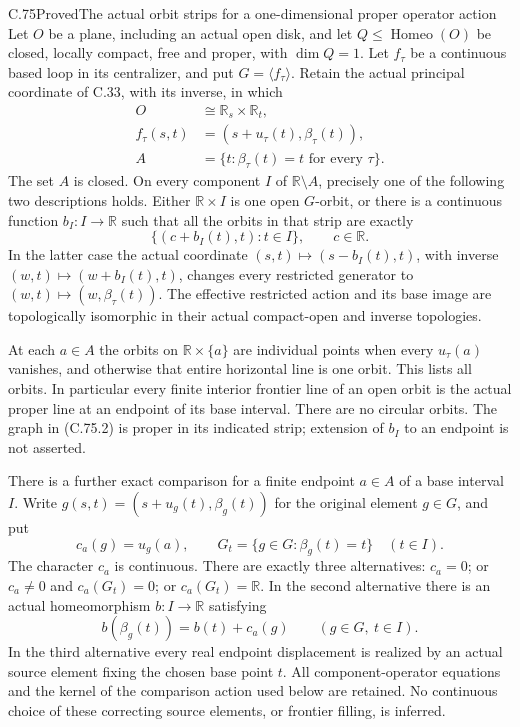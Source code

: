 \begin{claim}{C.75}{Proved}{The actual orbit strips for a one-dimensional proper operator action}
Let $O$ be a plane, including an actual open disk, and
let $Q\leq\operatorname{Homeo}(O)$ be closed, locally
compact, free and proper, with $\dim Q=1$.
Let $f_\tau$ be a continuous based loop in its
centralizer, and put $G=\langle f_\tau\rangle$.
Retain the actual principal coordinate of C.33,
with its inverse, in which
\[
 \begin{split}
 O&\cong\mathbb R_s\times\mathbb R_t,\\
 f_\tau(s,t)&=(s+u_\tau(t),\beta_\tau(t)),\\
 A&=\{t:\beta_\tau(t)=t\text{ for every }\tau\}.
 \end{split}                                                   \tag{C.75.1}
\]
The set $A$ is closed. On every component $I$ of
$\mathbb R\setminus A$, precisely one of the
following two descriptions holds.
Either $\mathbb R\times I$ is one open $G$-orbit,
or there is a continuous function $b_I:I\to\mathbb R$
such that all the orbits in that strip are exactly
\[
                   \{(c+b_I(t),t):t\in I\},
                                  \qquad c\in\mathbb R.        \tag{C.75.2}
\]
In the latter case the actual coordinate
$(s,t)\mapsto(s-b_I(t),t)$, with inverse
$(w,t)\mapsto(w+b_I(t),t)$, changes every restricted
generator to $(w,t)\mapsto(w,\beta_\tau(t))$.
The effective restricted action and its base image
are topologically isomorphic in their actual
compact-open and inverse topologies.

At each $a\in A$ the orbits on $\mathbb R\times\{a\}$
are individual points when every $u_\tau(a)$ vanishes,
and otherwise that entire horizontal line is one
orbit. This lists all orbits. In particular every
finite interior frontier line of an open orbit is
the actual proper line at an endpoint of its
base interval. There are no circular orbits.
The graph in (C.75.2) is proper in its indicated
strip; extension of $b_I$ to an endpoint is
not asserted.

There is a further exact comparison for a finite
endpoint $a\in A$ of a base interval $I$.
Write $g(s,t)=(s+u_g(t),\beta_g(t))$ for the
original element $g\in G$, and put
\[
 c_a(g)=u_g(a),\qquad
 G_t=\{g\in G:\beta_g(t)=t\}\quad(t\in I).
                                                               \tag{C.75.3}
\]
The character $c_a$ is continuous. There are
exactly three alternatives: $c_a=0$; or
$c_a\ne0$ and $c_a(G_t)=0$; or
$c_a(G_t)=\mathbb R$. In the second alternative
there is an actual homeomorphism
$b:I\to\mathbb R$ satisfying
\[
                 b(\beta_g(t))=b(t)+c_a(g)
                                  \qquad(g\in G,\ t\in I).
                                                               \tag{C.75.4}
\]
In the third alternative every real endpoint
displacement is realized by an actual source
element fixing the chosen base point $t$.
All component-operator equations and the kernel
of the comparison action used below are retained.
No continuous choice of these correcting source
elements, or frontier filling, is inferred.
\end{claim}

